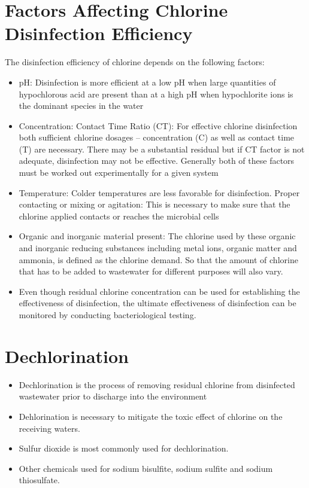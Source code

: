 \section{Factors Affecting Chlorine Disinfection Efficiency}

The disinfection efficiency of chlorine depends on the following factors:\\
\begin{itemize}
	\item pH:  Disinfection is more efficient at a low pH when large quantities of hypochlorous acid are present than at a high pH when hypochlorite ions is the dominant species in the water
	\item Concentration:  Contact Time Ratio (CT):  For effective chlorine disinfection both sufficient chlorine dosages – concentration (C) as well as contact time (T) are necessary.  There may be a substantial residual but if CT factor is not adequate, disinfection may not be effective. Generally both of these factors must be worked out experimentally for a given system
	\item Temperature:  Colder temperatures are less favorable for disinfection. 
Proper contacting or mixing or agitation:  This is necessary to make sure that the chlorine applied contacts or reaches the microbial cells
	\item Organic and inorganic material present:  The chlorine used by these organic and inorganic reducing substances including metal ions, organic matter and ammonia, is defined as the chlorine demand.  So that the amount of chlorine that has to be added to wastewater for different purposes will also vary.
\item Even though residual chlorine concentration can be used for establishing the effectiveness of disinfection, the ultimate effectiveness of disinfection can be monitored by conducting bacteriological testing.
\end{itemize}
		
\section{Dechlorination}
\begin{itemize}
\item Dechlorination is the process of removing residual chlorine from disinfected wastewater prior to discharge into the environment
\item Dehlorination is necessary to mitigate the toxic effect of chlorine on the receiving waters.  
\item Sulfur dioxide is most commonly used for dechlorination.
\item Other chemicals used for sodium bisulfite, sodium sulfite and sodium thiosulfate.
\end{itemize}

